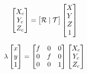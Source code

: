 \documentclass[12pt]{article}
\begin{document}
\begin{equation}  
\begin{bmatrix}
X_c\\
Y_c\\
Z_c\\
\end{bmatrix} =
 \begin{bmatrix}
\mathcal{R} \mid \mathcal{T}\\
\end{bmatrix}
\begin{bmatrix}
X\\
Y\\
Z\\
1
\end{bmatrix}\\
\label{eqn:scha}
\end{equation}

\begin{equation}  
\lambda\begin{bmatrix}
x\\
y\\
1\\
\end{bmatrix} =\begin{bmatrix}
f& 0 & 0 \\
0& f & 0 \\
0& 0 & 1
\end{bmatrix}  \begin{bmatrix}
X_c\\
Y_c\\
Z_c
\end{bmatrix}\\
\label{eqn:schb}
\end{equation}
\end{document}
